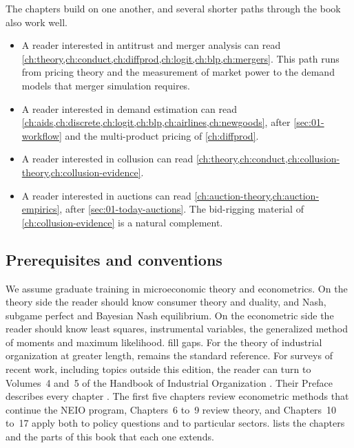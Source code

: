 The chapters build on one another, and several shorter paths through the book also work well.
\begin{itemize}
  \item A reader interested in antitrust and merger analysis can read
        \cref{ch:theory,ch:conduct,ch:diffprod,ch:logit,ch:blp,ch:mergers}. This path runs from pricing
        theory and the measurement of market power to the demand models that merger simulation requires.
  \item A reader interested in demand estimation can read
        \cref{ch:aids,ch:discrete,ch:logit,ch:blp,ch:airlines,ch:newgoods}, after \cref{sec:01-workflow} and
        the multi-product pricing of \cref{ch:diffprod}.
  \item A reader interested in collusion can read
        \cref{ch:theory,ch:conduct,ch:collusion-theory,ch:collusion-evidence}.
  \item A reader interested in auctions can read \cref{ch:auction-theory,ch:auction-empirics}, after
        \cref{sec:01-today-auctions}. The bid-rigging material of \cref{ch:collusion-evidence} is a natural
        complement.
\end{itemize}

\subsection{Prerequisites and conventions}\label{sec:01-roadmap-conventions}

We assume graduate training in microeconomic theory and econometrics. On the theory side the reader should
know consumer theory and duality, and Nash, subgame perfect and Bayesian Nash equilibrium. On the econometric
side the reader should know least squares, instrumental variables, the generalized method of moments and
maximum likelihood.  fill gaps. For the theory of industrial organization at
greater length, \citet{Tirole1988} remains the standard reference. For surveys of recent work, including topics
outside this edition, the reader can turn to Volumes~4 and~5 of the Handbook of Industrial Organization
\citep{HoHortacsuLizzeri2021a,HoHortacsuLizzeri2021}. Their Preface describes every chapter
\citep[pp.~xv--xxi]{HoHortacsuLizzeri2021}. The first five chapters review econometric methods that continue the
NEIO program, Chapters~6 to~9 review theory, and Chapters~10 to~17 apply both to policy questions and to
particular sectors.  lists the chapters and the parts of this book that each one extends.

